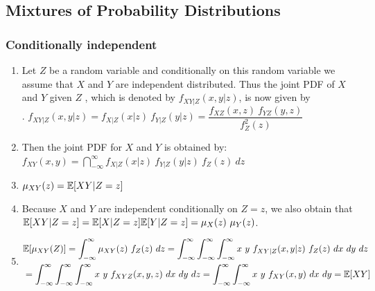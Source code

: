\subsection{Mixtures of Probability Distributions}

\subsubsection{Conditionally independent}

\begin{enumerate}
    \item Let $Z$ be a random variable and conditionally on this random variable we assume that $X$ and $Y$ are independent distributed.
    Thus the joint PDF of $X$ and $Y$ given $Z$ , which is denoted by $f _{X Y |Z} (x, y|z)$, is now given by
    \hfill \cite{statistics/book/Statistics-for-Data-Scientists/Maurits-Kaptein}
    \\
    .\hfill
    $
        f_{X Y |Z} (x, y|z)
        = f _{X|Z} (x|z)\ f_{Y |Z} (y|z)
        = \dfrac{f_{X Z} (x, z)\ f_{Y Z} (y, z) } {f^2_Z (z)}
    $
    \hfill \cite{statistics/book/Statistics-for-Data-Scientists/Maurits-Kaptein}

    \item Then the joint PDF for $X$ and $Y$ is obtained by:
    $
        f _{X Y} (x, y)
        = \dint ^{\infty }_{-\infty} f_{X|Z} (x|z)\ f_{Y |Z} (y|z)\ f_Z (z)\ dz
    $
    \hfill \cite{statistics/book/Statistics-for-Data-Scientists/Maurits-Kaptein}

    \item $\mu_{X Y} (z) = \mathbb{E}[X Y |Z = z]$
    \hfill \cite{statistics/book/Statistics-for-Data-Scientists/Maurits-Kaptein}

    \item Because $X$ and $Y$ are independent conditionally on $Z = z$, we also obtain that $\mathbb{E}[X Y |Z = z] = \mathbb{E}[X|Z = z] \mathbb{E}[Y |Z = z] = \mu_X (z)\ \mu_Y (z)$.
    \hfill \cite{statistics/book/Statistics-for-Data-Scientists/Maurits-Kaptein}

    \item
    $
        \begin{aligned}
            &\mathbb{E}[\mu_{X Y }(Z )]
            = \displaystyle\int^\infty_{-\infty} \mu_{X Y} (z)\ f_Z (z)\ dz
            = \displaystyle\int^\infty_{-\infty} \displaystyle\int^\infty_{-\infty} \displaystyle\int^\infty_{-\infty} x\ y\ f_{X Y |Z} (x, y|z)\ f_Z (z)\ dx\ dy\ dz \\
            &= \displaystyle\int^\infty_{-\infty} \displaystyle\int^\infty_{-\infty} \displaystyle\int^\infty_{-\infty} x\ y\ f_{X Y Z} (x, y, z)\ dx\ dy\ dz
            = \displaystyle\int^\infty_{-\infty} \displaystyle\int^\infty_{-\infty} x\ y\ f_{X Y} (x, y)\ dx\ dy
            = \mathbb{E}[X Y]
        \end{aligned}
    $
    \hfill \cite{statistics/book/Statistics-for-Data-Scientists/Maurits-Kaptein}


\end{enumerate}
